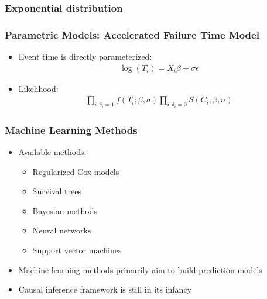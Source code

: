\documentclass[aspectratio=169, 12pt]{beamer}
\begin{document}
	\begin{frame}
	\frametitle{Exponential distribution}
	\end{frame}

	\begin{frame}
	\frametitle{Parametric Models: Accelerated Failure Time Model}
	\begin{itemize}
	\item Event time is directly parameterized:
	\begin{eqnarray*}
	\log(T_i) = X_i \beta + \sigma \epsilon
	\end{eqnarray*}
	\item Likelihood:
	\begin{eqnarray*}
	\prod_{i:\delta_i = 1} f(T_i; \beta, \sigma) \prod_{i:\delta_i = 0} S(C_i; \beta, \sigma)
	\end{eqnarray*}

	\end{itemize}

	\end{frame}

	\begin{frame}
	\frametitle{Machine Learning Methods}
	\begin{itemize}
	\item Available methods:
	\begin{itemize}
	\item Regularized Cox models
	\item Survival trees
	\item Bayesian methods
	\item Neural networks
	\item Support vector machines

	\end{itemize}
	\item Machine learning methods primarily aim to build prediction models
	\item Causal inference framework is still in its infancy

	\end{itemize}

	\end{frame}
\end{document}
